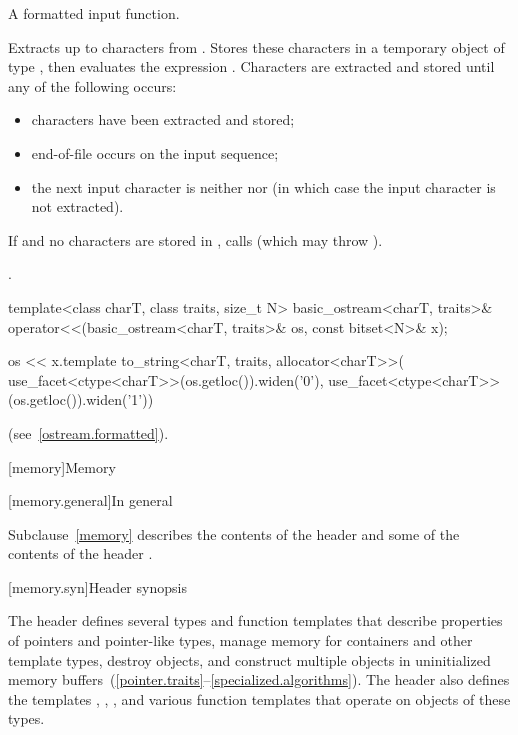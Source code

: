\begin{itemdescr}
\pnum
A formatted input function.

\pnum
\effects
Extracts up to  characters from .
Stores these characters in a temporary object  of type
,
then evaluates the expression
.
Characters are extracted and stored until any of the following occurs:
\begin{itemize}
\item
{} characters have been extracted and stored;
\item
{}%
end-of-file occurs on the input sequence;
\item
the next input character is neither
nor
(in which case the input character is not extracted).
\end{itemize}

\pnum
If  and no characters are stored in , calls
(which may throw
).

\pnum
\returns
{}.
\end{itemdescr}

%
\begin{itemdecl}
template<class charT, class traits, size_t N>
  basic_ostream<charT, traits>&
    operator<<(basic_ostream<charT, traits>& os, const bitset<N>& x);
\end{itemdecl}

\begin{itemdescr}
\pnum
\returns
\begin{codeblock}
os << x.template to_string<charT, traits, allocator<charT>>(
  use_facet<ctype<charT>>(os.getloc()).widen('0'),
  use_facet<ctype<charT>>(os.getloc()).widen('1'))
\end{codeblock}
(see~\ref{ostream.formatted}).
\end{itemdescr}

[memory]{Memory}

[memory.general]{In general}

\pnum
Subclause~\ref{memory} describes the contents of the header
 and some
of the contents of the header .

[memory.syn]{Header  synopsis}

\pnum
The header  defines several types and function templates that
describe properties of pointers and pointer-like types, manage memory
for containers and other template types, destroy objects, and
construct multiple objects in
uninitialized memory
buffers~(\ref{pointer.traits}--\ref{specialized.algorithms}).
The header also defines the templates
, , , and various function
templates that operate on objects of these types.

